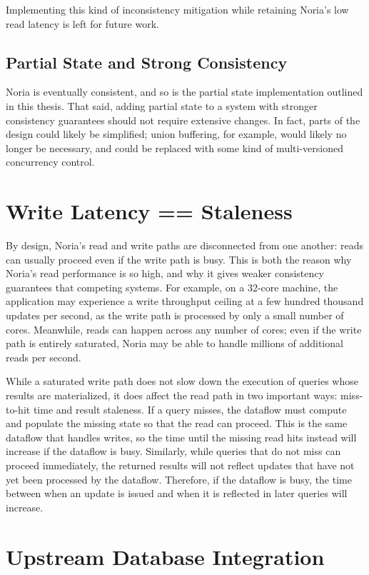 Implementing this kind of inconsistency mitigation while retaining Noria's low
read latency is left for future work.

\subsection{Partial State and Strong Consistency}

Noria is eventually consistent, and so is the partial state implementation
outlined in this thesis. That said, adding partial state to a system with
stronger consistency guarantees should not require extensive changes. In fact,
parts of the design could likely be simplified; union buffering, for example,
would likely no longer be necessary, and could be replaced with some kind of
multi-versioned concurrency control.

\section{Write Latency == Staleness}

By design, Noria's read and write paths are disconnected from one another: reads
can usually proceed even if the write path is busy. This is both the reason why
Noria's read performance is so high, and why it gives weaker consistency
guarantees that competing systems. For example, on a 32-core machine, the
application may experience a write throughput ceiling at a few hundred thousand
updates per second, as the write path is processed by only a small number of
cores. Meanwhile, reads can happen across any number of cores; even if the write
path is entirely saturated, Noria may be able to handle millions of additional
reads per second.

While a saturated write path does not slow down the execution of queries whose
results are materialized, it does affect the read path in two important ways:
miss-to-hit time and result staleness. If a query misses, the dataflow must
compute and populate the missing state so that the read can proceed. This is the
same dataflow that handles writes, so the time until the missing read hits
instead will increase if the dataflow is busy. Similarly, while queries that do
not miss can proceed immediately, the returned results will not reflect updates
that have not yet been processed by the dataflow. Therefore, if the dataflow is
busy, the time between when an update is issued and when it is reflected in
later queries will increase.

\section{Upstream Database Integration}

